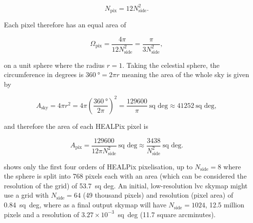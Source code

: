 \begin{colsection}
\begin{colsection}
\begin{equation}
    N_\text{pix} = 12 N_\text{side}^2.
    \label{eq:healpix_npix}
\end{equation}

Each pixel therefore has an equal area of

\begin{equation}
    \Omega_\text{pix} = \frac{4\pi}{12 N_\text{side}^2} = \frac{\pi}{3 N_\text{side}^2},
    \label{eq:healpix_area}
\end{equation}

on a unit sphere where the radius $r=1$. Taking the celestial sphere, the circumference in degrees is $\SI{360}{\degree} = 2 \pi r$ meaning the area of the whole sky is given by

\begin{equation}
    A_\text{sky} = 4 \pi r^2 = 4 \pi \left ( \frac{\SI{360}{\degree}}{2 \pi} \right )^2 = \frac{129600}{\pi}~\text{sq deg} \approx 41252~\text{sq deg} , %
    \label{eq:sky_area}
\end{equation}

and therefore the area of each HEALPix pixel is

\begin{equation}
    A_\text{pix} = \frac{129600}{12 \pi N_\text{side}^2}~\text{sq~deg} \approx \frac{3438}{N_\text{side}^2}~\text{sq~deg}.
    \label{eq:healpix_area_degrees}
\end{equation}

 shows only the first four orders of HEALPix pixelisation, up to $N_\text{side} = 8$ where the sphere is split into 768 pixels each with an area (which can be considered the resolution of the grid) of 53.7~sq deg. An initial, low-resolution \gls{lvc} skymap might use a grid with $N_\text{side} = 64$ (49 thousand pixels) and resolution (pixel area) of 0.84~sq~deg, where as a final output skymap will have $N_\text{side} = 1024$, 12.5 million pixels and a resolution of $3.27 \times 10^{-3}$~sq~deg (11.7 square arcminutes).



\end{colsection}
\end{colsection}
